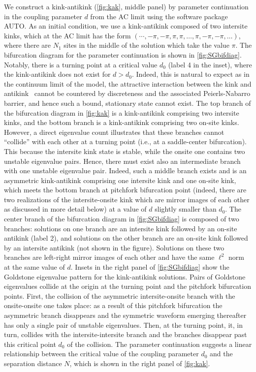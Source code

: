 \documentclass[12pt,reqno]{amsart}
\begin{document}
We construct a kink-antikink (\cref{fig:kak}, middle panel) by parameter continuation in the coupling parameter $d$ from the AC limit using the software package AUTO. As an initial condition, we use a kink-antikink composed of two intersite kinks, which at the AC limit has the form $(\cdots, -\pi, -\pi, \pi, \pi, \dots, \pi, -\pi, -\pi, \dots )$, where there are $N_1$ sites in the middle of the solution which take the value $\pi$. The bifurcation diagram for the parameter continuation is shown in \cref{fig:SGbifdiag}. Notably, there is a turning point at a critical value $d_0$ (label 4 in the inset), where the kink-antikink does not exist for $d > d_0$. 
Indeed, this is natural to expect as in the continuum
limit of the model, the attractive interaction between the
kink and antikink~\cite{MANTON1979397} 
cannot be countered by discreteness and the associated
Peierls-Nabarro barrier, and hence such a bound, stationary
state cannot exist. 
The top branch of the bifurcation diagram in \cref{fig:kak} is a kink-antikink comprising two intersite kinks, and the bottom branch is a kink-antikink comprising two on-site kinks. 
However, a direct eigenvalue count illustrates that
these branches cannot ``collide'' with each other
at a turning point (i.e., at a saddle-center bifurcation). This
because the intersite kink state is stable, while the
onsite one contains two unstable eigenvalue pairs. Hence,
there must exist also an intermediate branch with one
unstable eigenvalue pair.
Indeed, such a  middle branch exists and is an asymmetric kink-antikink comprising one intersite kink and one on-site kink, which meets the bottom branch at pitchfork bifurcation point 
(indeed, there are two realizations of the 
intersite-onsite kink which are mirror images of each other as
discussed in more detail below) at a value of $d$ slightly smaller than $d_0$. The center branch of the bifurcation diagram in \cref{fig:SGbifdiag} is composed of two branches: solutions on one branch are an intersite kink followed by an on-site antikink (label 2), and solutions on the other branch are an on-site kink followed by an intersite antikink (not shown in the figure). Solutions on these two branches are left-right mirror images of each other and have the same $\ell^2$ norm at the same value of $d$. Insets in the right panel of \cref{fig:SGbifdiag} show the Goldstone eigenvalue pattern for the kink-antikink solutions. Pairs of Goldstone eigenvalues collide at the origin at the turning point and the pitchfork bifurcation points. 
First, the collision of the asymmetric intersite-onsite
branch with the onsite-onsite one takes place: as a result
of this pitchfork bifurcation the asymmetric branch disappears
and the symmetric waveform emerging thereafter has only
a single pair of unstable eigenvalues. Then, at the turning point,
it, in turn, collides with the intersite-intersite branch 
and the branches disappear past this critical
point $d_0$ of the collision.
The parameter continuation suggests a linear relationship between the critical value of the coupling parameter $d_0$ and the separation distance $N$, which is shown in the right panel of  \cref{fig:kak}.
\end{document}
